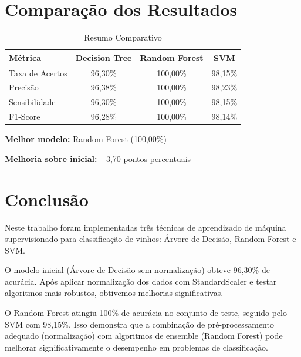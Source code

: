 \documentclass[12pt,a4paper]{article}
\begin{document}
\section{Comparação dos Resultados}

\begin{table}[H]
\centering
\caption{Resumo Comparativo}
\begin{tabular}{lccc}
\toprule
\textbf{Métrica} & \textbf{Decision Tree} & \textbf{Random Forest} & \textbf{SVM} \\
\midrule
Taxa de Acertos & 96,30\% & 100,00\% & 98,15\% \\
Precisão & 96,38\% & 100,00\% & 98,23\% \\
Sensibilidade & 96,30\% & 100,00\% & 98,15\% \\
F1-Score & 96,28\% & 100,00\% & 98,14\% \\
\bottomrule
\end{tabular}
\end{table}

\textbf{Melhor modelo:} Random Forest (100,00\%)

\textbf{Melhoria sobre inicial:} +3,70 pontos percentuais

\section{Conclusão}

Neste trabalho foram implementadas três técnicas de aprendizado de máquina supervisionado para classificação de vinhos: Árvore de Decisão, Random Forest e SVM. 

O modelo inicial (Árvore de Decisão sem normalização) obteve 96,30\% de acurácia. Após aplicar normalização dos dados com StandardScaler e testar algoritmos mais robustos, obtivemos melhorias significativas.

O Random Forest atingiu 100\% de acurácia no conjunto de teste, seguido pelo SVM com 98,15\%. Isso demonstra que a combinação de pré-processamento adequado (normalização) com algoritmos de ensemble (Random Forest) pode melhorar significativamente o desempenho em problemas de classificação.
\end{document}
